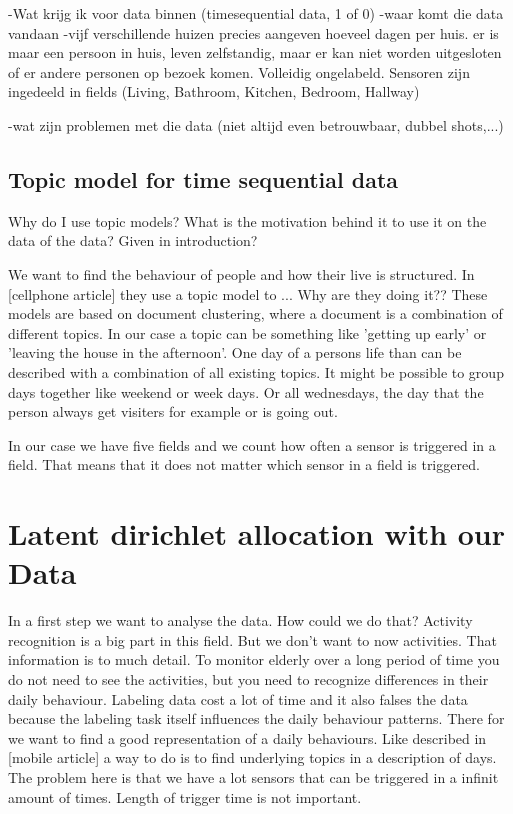 \documentclass[11pt,a4paper]{report}
\begin{document}
-Wat krijg ik voor data binnen (timesequential data, 1 of 0)
-waar komt die data vandaan
-vijf verschillende huizen precies aangeven hoeveel dagen per huis. er is maar een persoon in huis, leven zelfstandig, maar er kan niet worden uitgesloten of er andere personen op bezoek komen.
Volleidig ongelabeld.
Sensoren zijn ingedeeld in fields (Living, Bathroom, Kitchen, Bedroom, Hallway)

-wat zijn problemen met die data (niet altijd even betrouwbaar, dubbel shots,...)



\subsection{Topic model for time sequential data}
Why do I use topic models? What is the motivation behind it to use it on the data of the data? Given in introduction?

We want to find the behaviour of people and how their live is structured. In [cellphone article] they use a topic model to ... Why are they doing it??
These models are based on document clustering, where a document is a combination of different topics. In our case a topic can be something like 'getting up early' or 'leaving the house in the afternoon'. One day of a persons life than can be described with a combination of all existing topics. It might be possible to group days together like weekend or week days. Or all wednesdays, the day that the person always get visiters for example or is going out. 



In our case we have five fields and we count how often a sensor is triggered in a field. That means that it does not matter which sensor in a field is triggered.




\section{Latent dirichlet allocation with our Data}
In a first step we want to analyse the data. How could we do that? Activity recognition is a big part in this field. But we don't want to now activities. That information is to much detail. To monitor elderly over a long period of time you do not need to see the activities, but you need to recognize differences in their daily behaviour.
Labeling data cost a lot of time and it also falses the data because the labeling task itself influences the daily behaviour patterns. There for we want to find a good representation of a daily behaviours.
Like described in [mobile article] a way to do is to find underlying topics in a description of days.
The problem here is that we have a lot sensors that can be triggered in a infinit amount of times. Length of trigger time is not important.
\end{document}

